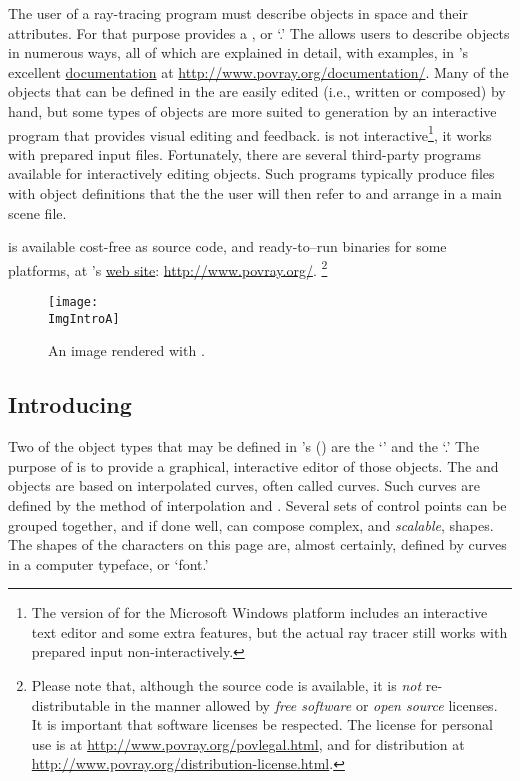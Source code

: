 The user of a ray-tracing program must describe objects in space
and their attributes. For that purpose \IXpov{} provides a
, or `.'
The 
allows users to describe objects in numerous ways, all of which
are explained in detail, with examples, in \IXpov{}'s
excellent \href{http://www.povray.org/documentation/}{documentation}
at \url{http://www.povray.org/documentation/}.
Many of the objects that can be defined in the  are easily
edited (i.e., written or composed) by hand, but some types of objects
are more suited to generation by an interactive program that
provides visual editing and feedback. \IXpov{} is not
interactive\footnote{The version of \IXpov{} for the
Microsoft Windows platform includes an interactive text editor and
some extra features, but the actual ray tracer still works
with prepared input non-interactively.},
it works with prepared input files. Fortunately, there are several
third-party programs available for interactively editing
\IXpov{}  objects. Such programs typically
produce  files with object definitions
that the the user will then refer to and arrange in a main scene file.

\IXpov{} is available cost-free as source code, and
ready-to--run binaries for some platforms, at
\IXpov's \href{http://www.povray.org/}{web site}:
\url{http://www.povray.org/}.
\footnote{Please note that, although the source code is available,
it is \emph{not} re-distributable in the manner allowed
by \emph{free software} or \emph{open source} licenses.
It is important that software licenses be respected.
The \IXpov{} license for personal use is at
\url{http://www.povray.org/povlegal.html}, and for distribution
at \url{http://www.povray.org/distribution-license.html}.}

\begin{figure}[htb]
\centering
\texttt{[image: \\ImgIntroA]}
\caption{An image rendered with \dtypov.}
\label{fig:pov_image_Intro_0}
\end{figure}


	\subsection{Introducing \dtypkgu}
	\label{ssec:intro_epspline}
Two of the object types that may be defined in \IXpov's
 ()
are the `\IXprism{}' and the `\IXlathe{}.'
The purpose of \IXpkg{} is to provide a graphical,
interactive editor of those objects. The \IXprism{} and \IXlathe{}
objects are based on interpolated curves, often called
 curves. Such curves are defined by
the method of interpolation and .
Several sets of control points can be grouped together, and
if done well, can compose complex, and \emph{scalable},
shapes.
The shapes of the characters on this page are, almost certainly,
defined by \IXspline{} curves in a computer typeface, or `font.'

